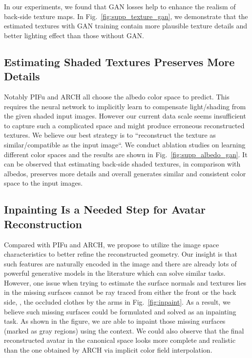 \documentclass[10pt,twocolumn,letterpaper]{article}
\begin{document}
In our experiments, we found that GAN losses help to enhance the realism of back-side texture maps. In Fig.~\ref{fig:supp_texture_gan}, we demonstrate that the estimated textures with GAN training contain more plausible texture details and better lighting effect than those without GAN.

\subsection{Estimating Shaded Textures Preserves More Details}

Notably PIFu and ARCH all choose the albedo color space to predict. This requires the neural network to implicitly learn to compensate light/shading from the given shaded input images. However our current data scale seems insufficient to capture such a complicated space and might produce erroneous reconstructed textures. We believe our best strategy is to ``reconstruct the texture as similar/compatible as the input image``. We conduct ablation studies on learning different color spaces and the results are shown in Fig.~\ref{fig:supp_albedo_gan}. It can be observed that estimating back-side shaded textures, in comparison with albedos, preserves more details and overall generates similar and consistent color space to the input images.

\subsection{Inpainting Is a Needed Step for Avatar Reconstruction}

Compared with PIFu and ARCH, we propose to utilize the image space characteristics to better refine the reconstructed geometry. Our insight is that such features are naturally encoded in the image and there are already lots of powerful generative models in the literature which can solve similar tasks. However, one issue when trying to estimate the surface normals and textures lies in the missing surfaces cannot be ray traced from either the front or the back side, \eg, the occluded clothes by the arms in Fig.~\ref{fig:inpaint}. As a result, we believe such missing surfaces could be formulated and solved as an inpainting task. As shown in the figure, we are able to inpaint those missing surfaces (marked as gray regions) using the context. We could also observe that the final reconstructed avatar in the canonical space looks more complete and realistic than the one obtained by ARCH via implicit color field interpolation.
\end{document}
